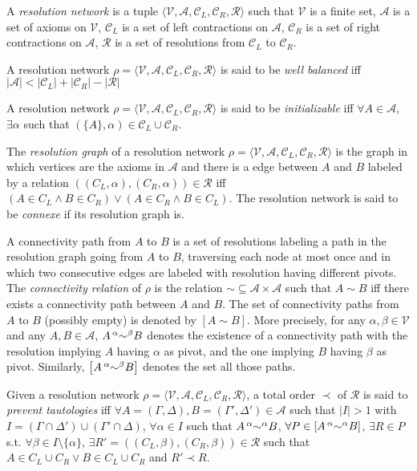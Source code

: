 \documentclass{article}
\newcommand{\card}[1]{\left| #1 \right|}
\newcommand{\varSet}{\mathcal{V}}
\newcommand{\axiomSet}{\mathcal{A}}
\newcommand{\conSet}{\mathcal{C}}
\newcommand{\resoSet}{\mathcal{R}}
\newcommand{\resoNet}{\rho}
\newcommand{\resoOrd}{\prec}
\newcommand{\connected}{\sim}
\newcommand{\cpath}[2]{\left[ #1 \connected #2 \right]}
\newcommand{\conwith}[2]{\prescript{#1}{}{\connected}^{#2}}
\newcommand{\cpathwith}[4]{\left[ #1 \conwith{#2}{#3} #4 \right]}
\begin{document}
A \emph{resolution network} is a tuple $\langle \varSet, \axiomSet, \conSet_L, \conSet_R, \resoSet \rangle$
such that
$\varSet$ is a finite set,
$\axiomSet$ is a set of axioms on $\varSet$,
$\conSet_L$ is a set of left contractions on $\axiomSet$,
$\conSet_R$ is a set of right contractions on $\axiomSet$,
$\resoSet$ is a set of resolutions from $\conSet_L$ to $\conSet_R$.

A resolution network $\resoNet = \langle \varSet, \axiomSet, \conSet_L, \conSet_R, \resoSet \rangle$
is said to be \emph{well balanced} iff
$
  \card{\axiomSet} < \card{\conSet_L} + \card{\conSet_R} - \card{\resoSet}
$

A resolution network $\resoNet = \langle \varSet, \axiomSet, \conSet_L, \conSet_R, \resoSet \rangle$
is said to be \emph{initializable} iff $\forall A \in \axiomSet$, $\exists \alpha$ such that
$(\{A\},\alpha) \in \conSet_L \cup \conSet_R$.

The \emph{resolution graph} of 
a resolution network $\resoNet = \langle \varSet, \axiomSet, \conSet_L, \conSet_R, \resoSet \rangle$
is the graph
in which vertices are the axioms in $\axiomSet$ and there is a edge between $A$ and $B$ labeled by a
relation $((C_L,\alpha),(C_R,\alpha)) \in \resoSet$ iff 
$
  \left( A \in C_L \wedge B \in C_R \right) \vee
  \left( A \in C_R \wedge B \in C_L \right)
$.
The resolution network is said to be \emph{connexe} if its resolution graph is.

A connectivity path from $A$ to $B$ is a set of resolutions labeling a path in the
resolution graph going from $A$ to $B$,
traversing each node at most once and in which two consecutive edges are labeled with
resolution having different pivots.
The \emph{connectivity relation} of $\resoNet$ is the relation $\connected \subseteq \axiomSet
\times \axiomSet$ such that $A \connected B$ iff there exists a connectivity path between $A$ and
$B$. The set of connectivity paths from $A$ to $B$ (possibly empty) is denoted by $\cpath{A}{B}$.
More precisely, for any $\alpha, \beta \in \varSet$ and any $A,B \in \axiomSet$, $A
\conwith{\alpha}{\beta} B$ denotes the existence of a connectivity path with the resolution implying
$A$ having $\alpha$ as pivot, and the one implying $B$ having $\beta$ as pivot. Similarly,
$\cpathwith{A}{\alpha}{\beta}{B}$ denotes the set all those paths.

Given a resolution network $\resoNet = \langle \varSet, \axiomSet, \conSet_L, \conSet_R, \resoSet
\rangle$, a total order $\resoOrd$ of $\resoSet$ is said to \emph{prevent tautologies} iff
$\forall A=(\Gamma,\Delta), B=(\Gamma',\Delta') \in \axiomSet$ such that $\card{I} > 1$ with
$I = \left( \Gamma \cap \Delta' \right) \cup \left( \Gamma' \cap \Delta \right)$,
$\forall \alpha \in I$ such that $A \conwith{\alpha}{\alpha} B$,
$\forall P \in \cpathwith{A}{\alpha}{\alpha}{B}$,
$\exists R \in P$ s.t. $\forall \beta \in I \setminus \{\alpha\}$,
$\exists R' = ((C_L,\beta),(C_R,\beta)) \in \resoSet$ such that
$A \in C_L \cup C_R \vee B \in C_L \cup C_R$ and $R' \resoOrd R$.
\end{document}
